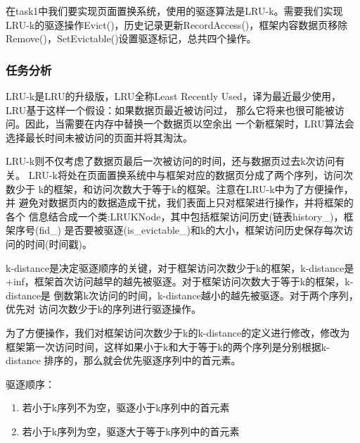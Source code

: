 \documentclass[a4paper]{article}
\begin{document}
在task1中我们要实现页面置换系统，使用的驱逐算法是LRU-k。需要我们实现
LRU-k的驱逐操作Evict()，历史记录更新RecordAccess()，框架内容数据页移除
Remove()，SetEvictable()设置驱逐标记，总共四个操作。

\subsubsection{任务分析}

LRU-k是LRU的升级版，LRU全称Least Recently Used，译为最近最少使用，
LRU基于这样一个假设：如果数据页最近被访问过，
那么它将来也很可能被访问。因此，当需要在内存中替换一个数据页以空余出
一个新框架时，LRU算法会选择最长时间未被访问的页面并将其淘汰。

LRU-k则不仅考虑了数据页最后一次被访问的时间，还与数据页过去k次访问有关。
LRU-k将处在页面置换系统中与框架对应的数据页分成了两个序列，访问次数少于
k的框架，和访问次数大于等于k的框架。注意在LRU-k中为了方便操作，并
避免对数据页内的数据造成干扰，我们表面上只对框架进行操作，并将框架的各个
信息结合成一个类:LRUKNode，其中包括框架访问历史(链表history\_)，框架序号(fid\_)
是否要被驱逐(is\_evictable\_)和k的大小，框架访问历史保存每次访问的时间(时间戳)。

k-distance是决定驱逐顺序的关键，对于框架访问次数少于k的框架，k-distance是
+inf，框架首次访问越早的越先被驱逐。对于框架访问次数大于等于k的框架，k-distance是
倒数第k次访问的时间，k-distance越小的越先被驱逐。对于两个序列，优先对
访问次数少于k的序列进行驱逐操作。

为了方便操作，我们对框架访问次数少于k的k-distance的定义进行修改，修改为
框架第一次访问时间，这样如果小于k和大于等于k的两个序列是分别根据k-distance
排序的，那么就会优先驱逐序列中的首元素。

驱逐顺序：
\begin{enumerate}
   \item 若小于k序列不为空，驱逐小于k序列中的首元素
   \item 若小于k序列为空，驱逐大于等于k序列中的首元素
 \end{enumerate}
\end{document}
